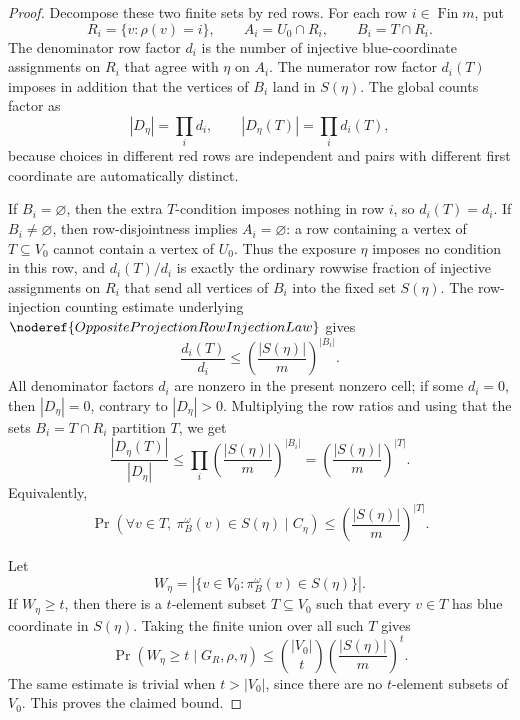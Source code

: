 \begin{proof}
Decompose these two finite sets by red rows.  For each row
\(i\in\operatorname{Fin}m\), put
\[
R_i=\{v:\rho(v)=i\},\qquad A_i=U_0\cap R_i,\qquad
B_i=T\cap R_i.
\]
The denominator row factor \(d_i\) is the number of injective blue-coordinate
assignments on \(R_i\) that agree with \(\eta\) on \(A_i\).  The numerator
row factor \(d_i(T)\) imposes in addition that the vertices of \(B_i\) land
in \(S(\eta)\).  The global counts factor as
\[
|D_\eta|=\prod_i d_i,\qquad |D_\eta(T)|=\prod_i d_i(T),
\]
because choices in different red rows are independent and pairs with
different first coordinate are automatically distinct.

If \(B_i=\varnothing\), then the extra \(T\)-condition imposes nothing in row
\(i\), so \(d_i(T)=d_i\).  If \(B_i\ne\varnothing\), then row-disjointness
implies \(A_i=\varnothing\): a row containing a vertex of \(T\subseteq V_0\)
cannot contain a vertex of \(U_0\).  Thus the exposure \(\eta\) imposes no
condition in this row, and \(d_i(T)/d_i\) is exactly the ordinary rowwise
fraction of injective assignments on \(R_i\) that send all vertices of
\(B_i\) into the fixed set \(S(\eta)\).  The row-injection counting estimate
underlying \(\noderef{OppositeProjectionRowInjectionLaw}\) gives
\[
\frac{d_i(T)}{d_i}\le
\left(\frac{|S(\eta)|}{m}\right)^{|B_i|}.
\]
All denominator factors \(d_i\) are nonzero in the present nonzero cell; if
some \(d_i=0\), then \(|D_\eta|=0\), contrary to \(|D_\eta|>0\).
Multiplying the row ratios and using that the sets \(B_i=T\cap R_i\)
partition \(T\), we get
\[
\frac{|D_\eta(T)|}{|D_\eta|}
\le
\prod_i\left(\frac{|S(\eta)|}{m}\right)^{|B_i|}
=
\left(\frac{|S(\eta)|}{m}\right)^{|T|}.
\]
Equivalently,
\[
\Pr(\forall v\in T,\ \pi_B^\omega(v)\in S(\eta)\mid C_\eta)
\le \left(\frac{|S(\eta)|}{m}\right)^{|T|}.
\]

Let
\[
W_\eta=|\{v\in V_0:\pi_B^\omega(v)\in S(\eta)\}|.
\]
If \(W_\eta\ge t\), then there is a \(t\)-element subset
\(T\subseteq V_0\) such that every \(v\in T\) has blue coordinate in
\(S(\eta)\).  Taking the finite union over all such \(T\) gives
\[
\Pr(W_\eta\ge t\mid G_R,\rho,\eta)
\le \binom{|V_0|}{t}\left(\frac{|S(\eta)|}{m}\right)^t.
\]
The same estimate is trivial when \(t>|V_0|\), since there are no
\(t\)-element subsets of \(V_0\).  This proves the claimed bound.
\end{proof}
